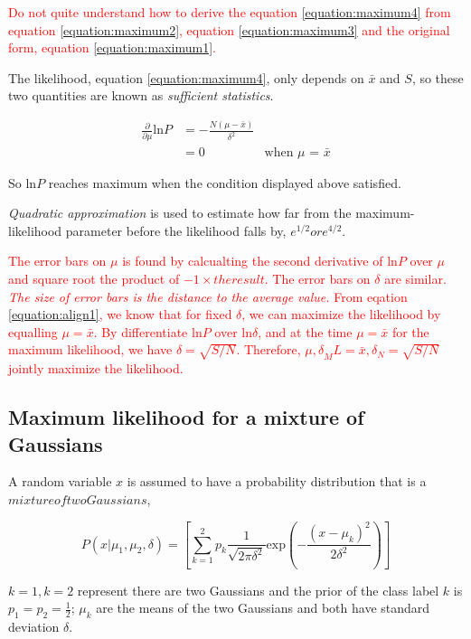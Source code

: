 \documentclass[11pt]{article}
\begin{document}
\textcolor{red}{Do not quite understand how to derive the equation \ref{equation:maximum4} from equation \ref{equation:maximum2}, equation \ref{equation:maximum3} and the original form, equation \ref{equation:maximum1}.}

The likelihood, equation \ref{equation:maximum4}, only depends on $\bar{x}$ and $S$, so these two quantities are known as \textit{sufficient statistics}.

\begin{align}
\frac{\partial}{\partial \mu} \mathrm{ln} P &= -\frac{N(\mu - \bar{x})}{\delta^2}
\\ &= 0 &\text{when $\mu$ = $\bar{x}$}
\label{equation:align1}
\end{align}

So $\mathrm{ln} P$ reaches maximum when the condition displayed above satisfied.

\textit{Quadratic approximation} is used to estimate how far from the maximum-likelihood parameter before the likelihood falls by, $e^{1/2} or e^{4/2}$.

\textcolor{red}{The error bars on $\mu$ is found by calcualting the second derivative of $\mathrm{ln} P$ over $\mu$ and square root the product of $-1 \times the result$. The error bars on $\delta$ are similar. \textit{The size of error bars is the distance to the average value.} From eqation \ref{equation:align1}, we know that for fixed $\delta$, we can maximize the likelihood by equalling $\mu = \bar{x}$. By differentiate $\mathrm{ln} P$ over $\mathrm{ln} \delta$, and at the time $\mu = \bar{x}$ for the maximum likelihood, we have $\delta = \sqrt{S/N}$. Therefore, ${\mu,\delta}_ML = {\bar{x},\delta_N = \sqrt{S/N}}$ jointly maximize the likelihood.}



\subsection{Maximum likelihood for a mixture of Gaussians}
A random variable $x$ is assumed to have a probability distribution that is a $mixture of two Gaussians$,

\begin{equation}
  P(x|\mu_1,\mu_2,\delta) = [\sum_{k=1}^2 p_k \frac{1}{\sqrt{2\pi\delta^2}} \mathrm{exp}(-\frac{(x - \mu_k)^2}{2\delta^2})]
  \label{equation:mixtureofGaussian}
\end{equation}

$k = 1, k = 2$ represent there are two Gaussians and the prior of the class label $k$ is ${p_1 = p_2 = \frac{1}{2}}$; ${\mu_k}$ are the means of the two Gaussians and both have standard deviation $\delta$.
\end{document}
